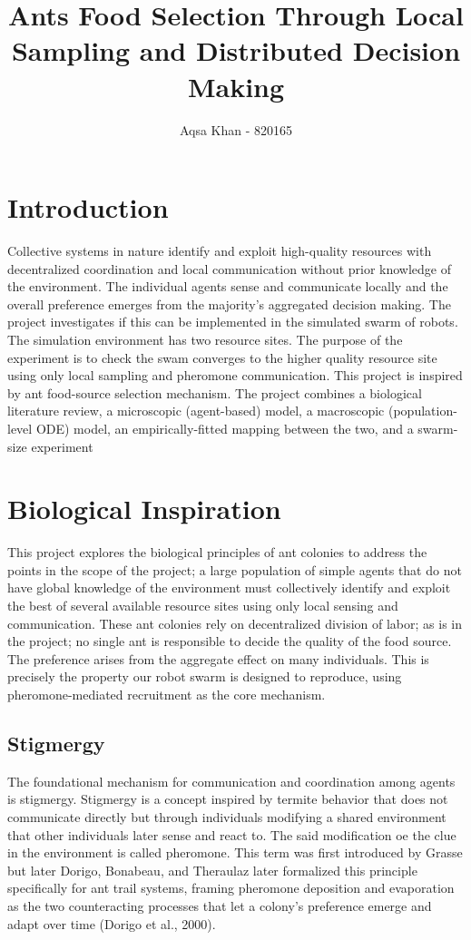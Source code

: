 \documentclass{article}
\title{Ants Food Selection Through Local Sampling and Distributed Decision Making}
\author{Aqsa Khan - 820165}
\begin{document}
\maketitle

\section{Introduction}
Collective systems in nature identify and exploit high-quality resources with decentralized coordination and  local communication without prior knowledge of the environment. The individual agents sense and communicate locally and the overall preference emerges from the majority's aggregated decision making. The project investigates if this can be implemented in the simulated swarm of robots. The simulation environment has two resource sites. The purpose of the experiment is to check the swam converges to the higher quality resource site using only local sampling and pheromone communication. This project is inspired by ant food-source selection mechanism. The project combines a biological literature review, a microscopic (agent-based) model, a macroscopic (population-level ODE) model, an empirically-fitted mapping between the two, and a swarm-size experiment

\section{Biological Inspiration}
This project explores the biological principles of ant colonies to address the
points in the scope of the project; a large population of simple agents that do
not have global knowledge of the environment must collectively identify and
exploit the best of several available resource sites using only local sensing and
communication. These ant colonies rely on decentralized division of labor; as
is in the project; no single ant is responsible to decide the quality of the food
source. The preference arises from the aggregate effect on many individuals.
This is precisely the property our robot swarm is designed to reproduce, using
pheromone-mediated recruitment as the core mechanism. 
\subsection{Stigmergy}
The foundational mechanism for communication and coordination among agents is stigmergy. Stigmergy is a concept inspired by termite behavior that does not communicate directly but through individuals modifying a shared environment that other individuals later sense and react to. The said modification oe the clue in the environment is called pheromone. This term was first introduced by Grasse but later Dorigo, Bonabeau, and Theraulaz later formalized this principle specifically for ant trail systems, framing pheromone deposition and evaporation as the two counteracting processes that let a colony's preference emerge and adapt over time (Dorigo et al., 2000).
\end{document}
